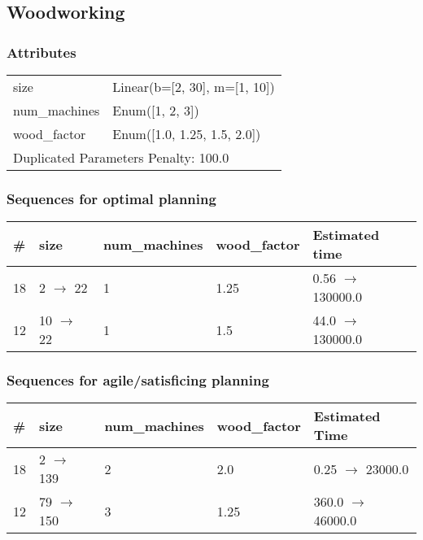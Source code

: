 \documentclass{article}
\begin{document}
                            \newpage \subsection{Woodworking}
                    \subsubsection*{Attributes}
                    \begin{tabular}{@{}p{}p{}@{}}
                    \toprule
                    size & Linear(b=[2, 30], m=[1, 10])\\
num\_machines & Enum([1, 2, 3])\\
wood\_factor & Enum([1.0, 1.25, 1.5, 2.0]) \\
                    \bottomrule
                    \multicolumn{2}{l}{Duplicated Parameters Penalty: 100.0}
                    \end{tabular}
                
                            \subsubsection*{Sequences for optimal planning}

                            \begin{center}
                            \begin{tabular}{@{}l|l|l|l|l@{}}
                            \# & size & num\_machines & wood\_factor & Estimated time\\\midrule
                            18&2 $\rightarrow$ 22&1&1.25&0.56 $\rightarrow$ 130000.0\\
12&10 $\rightarrow$ 22&1&1.5&44.0 $\rightarrow$ 130000.0
                            \end{tabular}
                            \end{center}
                    
                         \subsubsection*{Sequences for agile/satisficing planning}

                        \begin{center}
                        \begin{tabular}{@{}l|l|l|l|l@{}}
                        \# & size & num\_machines & wood\_factor & Estimated Time\\\midrule
                        18&2 $\rightarrow$ 139&2&2.0&0.25 $\rightarrow$ 23000.0\\
12&79 $\rightarrow$ 150&3&1.25&360.0 $\rightarrow$ 46000.0
                        \end{tabular}
                        \end{center}
                    
\end{document}

